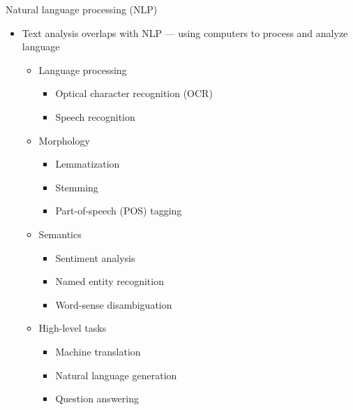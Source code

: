 \documentclass[pdf, 9pt, fleqn, handout]{beamer}
\begin{document}
\begin{frame}{Natural language processing (NLP)}
\begin{itemize}
\item Text analysis overlaps with NLP — using computers to process and analyze language \\[0.5em]
\begin{itemize}
\item Language processing \\[0.5em]
\begin{itemize}
\item Optical character recognition (OCR) \\[0.5em]
\item Speech recognition \\[0.5em]
\end{itemize}
\item Morphology \\[0.5em]
\begin{itemize}
\item Lemmatization \\[0.5em]
\item Stemming \\[0.5em]
\item Part-of-speech (POS) tagging \\[0.5em]
\end{itemize}
\item Semantics \\[0.5em]
\begin{itemize}
\item Sentiment analysis \\[0.5em]
\item Named entity recognition \\[0.5em]
\item Word-sense disambiguation \\[0.5em]
\end{itemize}
\item High-level tasks \\[0.5em]
\begin{itemize}
\item Machine translation \\[0.5em]
\item Natural language generation \\[0.5em]
\item Question answering 
\end{itemize}
\end{itemize}
\end{itemize}
\end{frame}
\end{document}
